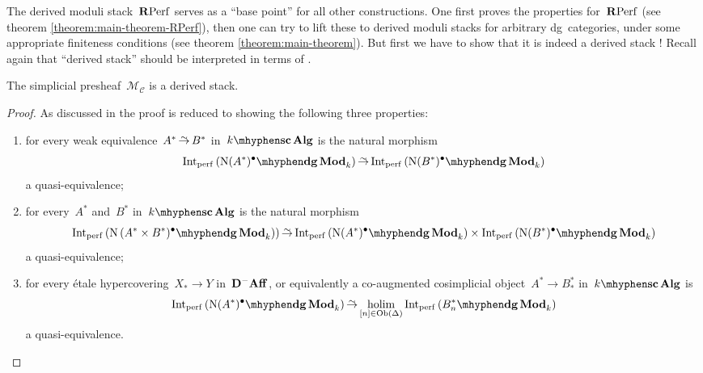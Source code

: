 \begin{refsection}
The derived moduli stack~$\mathbf{R}\mathrm{Perf}$ serves as a ``base point'' for all other constructions. One first proves the properties for~$\mathbf{R}\mathrm{Perf}$ (see theorem \ref{theorem:main-theorem-RPerf}), then one can try to lift these to derived moduli stacks for arbitrary dg~categories, under some appropriate finiteness conditions (see theorem \ref{theorem:main-theorem}). But first we have to show that it is indeed a derived stack \cite[lemma 3.1]{toen-vaquie-moduli-of-objects-in-dg-categories}! Recall again that ``derived stack'' should be interpreted in terms of \cite[definition 1.3.2.1]{toen-vezzosi-hag-II}.

\begin{theorem}
  \label{theorem:derived-moduli-stack-is-stack}
  The simplicial presheaf~$\mathcal{M}_{\mathcal{C}}$ is a derived stack.

  \begin{proof}[Proof]
    As discussed in \cite[corollary 1.3.2.4]{toen-vezzosi-hag-II} the proof is reduced to showing the following three properties:
    \begin{enumerate}
      \item for every weak equivalence~$A^*\weq B^*$ in~$\scAlg{k}$ is the natural morphism
        \begin{equation}
          \label{equation:condition-1}
          \Int_\perf\left( \dgMod{\nerve(A^*)^\bullet}_k \right)\weq\Int_\perf\left( \dgMod{\nerve(B^*)^\bullet}_k \right)
        \end{equation}
        a quasi-equivalence;
      \item for every~$A^*$ and~$B^*$ in~$\scAlg{k}$ is the natural morphism
        \begin{equation}
          \Int_\perf\left( \dgMod{\nerve\left( A^*\times B^*)^\bullet}_k \right) \right)\weq\Int_\perf\left( \dgMod{\nerve(A^*)^\bullet}_k \right)\times\Int_\perf\left( \dgMod{\nerve(B^*)^\bullet}_k \right)
        \end{equation}
        a quasi-equivalence;
      \item for every \'etale hypercovering~$X_*\to Y$ in~$\mathbf{D}^-\mathbf{Aff}$, or equivalently a co-augmented cosimplicial object~$A^*\to B_*^*$ in~$\scAlg{k}$ is
        \begin{equation}
          \label{equation:condition-3}
          \Int_\perf\left( \dgMod{\nerve(A^*)^\bullet}_k \right)\weq\holim_{[n]\in\Ob(\Delta)}\Int_\perf\left( \dgMod{B_n^*}_k \right)
        \end{equation}
        a quasi-equivalence.
    \end{enumerate}


\end{proof}
\end{theorem}
\end{refsection}
